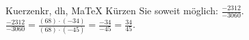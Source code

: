 \begin{MAufgabe}{Kuerzen}{kr, dh, MaTeX}
K\"urzen Sie soweit m\"oglich: $\frac{-2312}{-3060}$.\\ 
\ifLsg\MLoesung
\quad $\frac{-2312}{-3060}=\frac{(68)\cdot(-34)}{(68)\cdot(-45)}=\frac{-34}{-45}=\frac{34}{45}$.\else\relax\fi
 \end{MAufgabe}